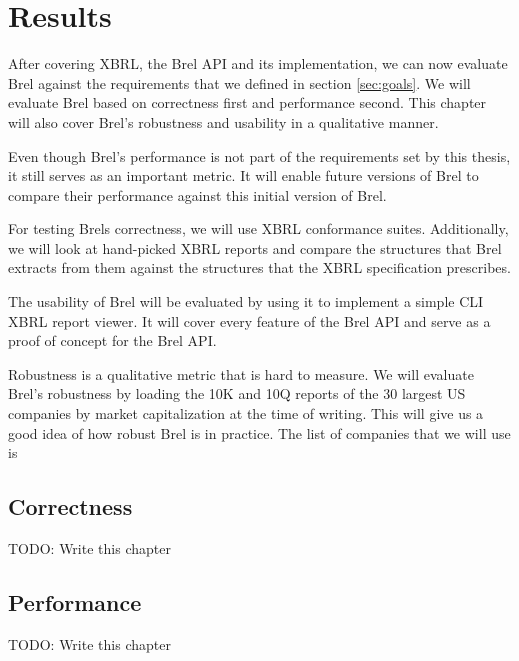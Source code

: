 \chapter{Results}
\label{chapter:results}

After covering XBRL, the Brel API and its implementation, we can now evaluate Brel against the requirements that we defined in section \ref{sec:goals}.
We will evaluate Brel based on correctness first and performance second.
This chapter will also cover Brel's robustness and usability in a qualitative manner.

Even though Brel's performance is not part of the requirements set by this thesis,
it still serves as an important metric.
It will enable future versions of Brel to compare their performance against this initial version of Brel.

For testing Brels correctness, we will use XBRL conformance suites.
Additionally, we will look at hand-picked XBRL reports and compare the structures that Brel extracts from them against the structures that the XBRL specification prescribes.

The usability of Brel will be evaluated by using it to implement a simple CLI XBRL report viewer.
It will cover every feature of the Brel API and serve as a proof of concept for the Brel API.

Robustness is a qualitative metric that is hard to measure.
We will evaluate Brel's robustness by loading the 10K and 10Q reports of the 30 largest US companies by market capitalization at the time of writing.
This will give us a good idea of how robust Brel is in practice.
The list of companies that we will use is

\section{Correctness}
\label{sec:correctness}

TODO: Write this chapter

\section{Performance}
\label{sec:performance}

TODO: Write this chapter





